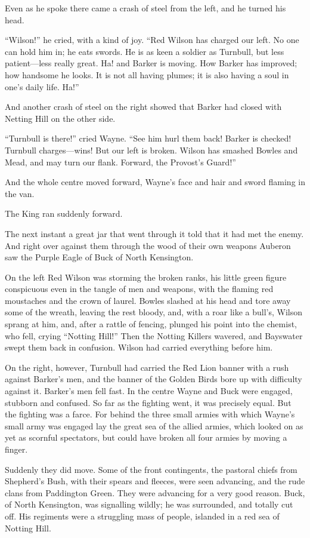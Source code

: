 \documentclass{book}
\begin{document}
Even as he spoke there came a crash of steel from the left, and he turned his head.

“Wilson!” he cried, with a kind of joy. “Red Wilson has charged our left. No one can hold him in; he eats swords. He is as keen a soldier as Turnbull, but less patient—less really great. Ha! and Barker is moving. How Barker has improved; how handsome he looks. It is not all having plumes; it is also having a soul in one’s daily life. Ha!”

And another crash of steel on the right showed that Barker had closed with Netting Hill on the other side.

“Turnbull is there!” cried Wayne. “See him hurl them back! Barker is checked! Turnbull charges—wins! But our left is broken. Wilson has smashed Bowles and Mead, and may turn our flank. Forward, the Provost’s Guard!”

And the whole centre moved forward, Wayne’s face and hair and sword flaming in the van.

The King ran suddenly forward.

The next instant a great jar that went through it told that it had met the enemy. And right over against them through the wood of their own weapons Auberon saw the Purple Eagle of Buck of North Kensington.

On the left Red Wilson was storming the broken ranks, his little green figure conspicuous even in the tangle of men and weapons, with the flaming red moustaches and the crown of laurel. Bowles slashed at his head and tore away some of the wreath, leaving the rest bloody, and, with a roar like a bull’s, Wilson sprang at him, and, after a rattle of fencing, plunged his point into the chemist, who fell, crying “Notting Hill!” Then the Notting Killers wavered, and Bayswater swept them back in confusion. Wilson had carried everything before him.

On the right, however, Turnbull had carried the Red Lion banner with a rush against Barker’s men, and the banner of the Golden Birds bore up with difficulty against it. Barker’s men fell fast. In the centre Wayne and Buck were engaged, stubborn and confused. So far as the fighting went, it was precisely equal. But the fighting was a farce. For behind the three small armies with which Wayne’s small army was engaged lay the great sea of the allied armies, which looked on as yet as scornful spectators, but could have broken all four armies by moving a finger.

Suddenly they did move. Some of the front contingents, the pastoral chiefs from Shepherd’s Bush, with their spears and fleeces, were seen advancing, and the rude clans from Paddington Green. They were advancing for a very good reason. Buck, of North Kensington, was signalling wildly; he was surrounded, and totally cut off. His regiments were a struggling mass of people, islanded in a red sea of Notting Hill.
\end{document}
